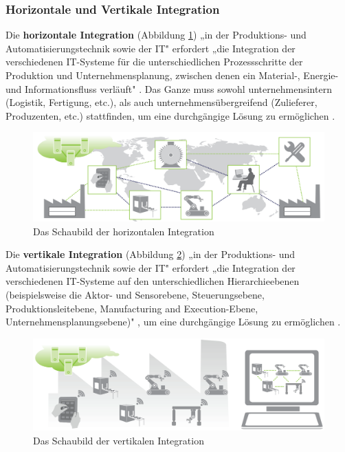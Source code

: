 \subsubsection{Horizontale und Vertikale Integration}\label{sec:HorizontaleVertikaleIntegration}
Die \textbf{horizontale Integration} (Abbildung \ref{fig:HorizontaleIntegration}) „in der Produktions- und Automatisierungstechnik sowie der IT" \cite[S.24]{12} erfordert „die Integration der verschiedenen IT-Systeme für die unterschiedlichen Prozessschritte der Produktion und Unternehmensplanung, zwischen denen ein Material-, Energie- und Informationsfluss verläuft" \cite[S.24]{12}. Das Ganze muss sowohl unternehmensintern (Logistik, Fertigung, etc.), als auch unternehmensübergreifend (Zulieferer, Produzenten, etc.) stattfinden, um eine durchgängige Lösung zu ermöglichen \cite[S.24]{12}.
\begin{figure}[h]
	\centering
	\includegraphics[width=0.7\linewidth]{Bilder/A3_HorizontaleIntegration}
	\caption{Das Schaubild der horizontalen Integration \cite[S.35]{12}}
	\label{fig:HorizontaleIntegration}
\end{figure}
\newline
\noindent Die \textbf{vertikale Integration} (Abbildung \ref{fig:VertikaleIntegration}) „in der Produktions- und Automatisierungstechnik sowie der IT" \cite[S.24]{12} erfordert „die Integration der verschiedenen IT-Systeme auf den unterschiedlichen Hierarchieebenen (beispielsweise die Aktor- und Sensorebene, Steuerungsebene, Produktionsleitebene, Manufacturing and Execution-Ebene, Unternehmensplanungsebene)" \cite[S.24]{12}, um eine durchgängige Lösung zu ermöglichen \cite[S.24]{12}.
\begin{figure}[h]
	\centering
	\includegraphics[width=0.7\linewidth]{Bilder/A4_VertikaleIntegration}
	\caption{Das Schaubild der vertikalen Integration \cite[S.36]{12}}
	\label{fig:VertikaleIntegration}
\end{figure}

